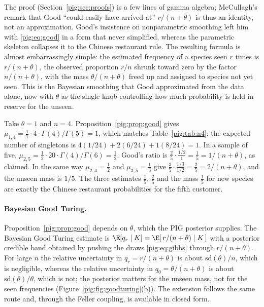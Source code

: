 The proof (Section~\ref{pig:sec:proofs}) is a few lines of gamma algebra; McCullagh's remark that Good ``could easily have arrived at'' $r/(n+\theta)$ is thus an identity, not an approximation. Good's insistence on nonparametric smoothing left him with \eqref{pig:eq:good} in a form that never simplified, whereas the parametric skeleton collapses it to the Chinese restaurant rule. The resulting formula is almost embarrassingly simple: the estimated frequency of a species seen $r$ times is $r/(n+\theta)$, the observed proportion $r/n$ shrunk toward zero by the factor $n/(n+\theta)$, with the mass $\theta/(n+\theta)$ freed up and assigned to species not yet seen. This is the Bayesian smoothing that Good approximated from the data alone, now with $\theta$ as the single knob controlling how much probability is held in reserve for the unseen.

\begin{example}\label{pig:ex:goodhand}
Take $\theta=1$ and $n=4$. Proposition~\ref{pig:prop:good} gives $\mu_{1,4}=\frac11\cdot4\cdot\Gamma(4)/\Gamma(5)=1$, which matches Table~\ref{pig:tab:n4}: the expected number of singletons is $4(1/24)+2(6/24)+1(8/24)=1$. In a sample of five, $\mu_{2,5}=\frac12\cdot20\cdot\Gamma(4)/\Gamma(6)=\frac12$. Good's ratio is $\frac{2}{5}\cdot\frac{1/2}{1}=\frac15=1/(n+\theta)$, as claimed. In the same way $\mu_{2,4}=\tfrac12$ and $\mu_{3,5}=\tfrac13$ give $\frac35\cdot\frac{1/3}{1/2}=\frac25=2/(n+\theta)$, and the unseen mass is $1/5$. The three estimates $\tfrac15$, $\tfrac25$ and the mass $\tfrac15$ for new species are exactly the Chinese restaurant probabilities for the fifth customer.
\end{example}

\paragraph{Bayesian Good Turing.} Proposition~\ref{pig:prop:good} depends on $\theta$, which the PIG posterior supplies. The Bayesian Good Turing estimate is $\E[q_r\mid K]=\E[\,r/(n+\theta)\mid K\,]$ with a posterior credible band obtained by pushing the draws \eqref{pig:eq:gibbs} through $r/(n+\theta)$. For large $n$ the relative uncertainty in $q_r=r/(n+\theta)$ is about $\mathrm{sd}(\theta)/n$, which is negligible, whereas the relative uncertainty in $q_0=\theta/(n+\theta)$ is about $\mathrm{sd}(\theta)/\theta$, which is not; the posterior matters for the unseen mass, not for the seen frequencies (Figure~\ref{pig:fig:goodturing}(b)). The \citet{pig:goodtoulmin1956} extension follows the same route and, through the Feller coupling, is available in closed form.

